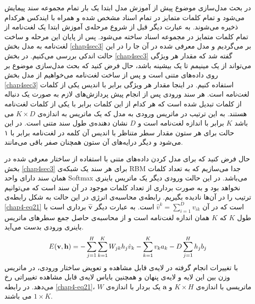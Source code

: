 در بحث مدل‌سازی موضوع پیش از آموزش مدل ابتدا یک بار تمام مجموعه سند پیمایش می‌‌شود و تمام کلمات متمایز در تمام اسناد مشخص شده و همراه با ایندکس هرکدام ذخیره می‌‌شوند. به عبارت دیگر قبل از شروع مرحله‌ی آموزش ابتدا یک لغت‌نامه از تمام کلمات متمایز در مجموعه اسناد ساخته می‌‌شود. پس از پایان این مرحله و ساخت لغت‌نامه به مدل بخش
\ref{chap4sec3}
بر می‌‌گردیم و مدل معرفی‌ شده در آن جا را در این حالت اندکی‌ بررسی‌ می‌‌کنیم. در بخش
\ref{chap4sec3}
گفته شد که مقدار هر ویژگی‌ می‌‌تواند از یک مینیمم تا یک بیشینه باشد، حال فرض کنید که بحث مدل‌سازی موضوع بر روی داده‌های متنی است و پس از ساخت لغت‌نامه می‌خواهیم از مدل بخش
\ref{chap4sec3}
استفاده کنیم. در اینجا مقدار هر ویژگی‌ برابر با اندیس یکی‌ از کلمات لغت‌نامه است. هر سند ورودی پس از انجام پیش پردازش‌های لازم به صورت یک دنباله از کلمات تبدیل شده است که هر کدام از این کلمات برابر با یکی‌ از کلمات لغت‌نامه هستند. به این ترتیب در ماتریس ورودی به مدل که یک ماتریس به انداز‌ه‌ی
$K \times D$
می‌ باشد
$K$
برابر با اندازه لغت‌نامه است و
$D$
نشان دهنده‌ی طول سند متنی است. در این حالت برای هر ستون مقدار سطر متناظر با اندیس آن کلمه در لغت‌نامه برابر با ۱ می‌‌شود و دیگر درایه‌های آن ستون همچنان صفر باقی‌ می‌‌مانند.

حال فرض کنید که برای مدل کردن داده‌های متنی با استفاده از ساختار معرفی‌ شده در بخش
\ref{chap4sec3}
برای هر سند یک شبکه‌ی
RBM
جدا می‌‌سازیم که به تعداد کلمات همان سند دارای واحد
Softmax
می‌باشد. در این حالت ورودی دیگر یک ماتریس باینری نخواهد بود و به صورت برداری از تعداد کلمات موجود در آن سند است که می‌‌توانیم ترتیب را در آن‌ها نادیده بگیریم. رابطه‌ی محاسبه‌ی انرژی در این حالت به شکل رابطه‌ی
\ref{chap4-eq21}
است که در آن
$\hat{v}^k = \sum_{i=1}^{D}v_{ik}$
است. به عبارت دیگر
$\hat{\textbf{v}}$
برداری است با طول
$K$
که 
$K$
همان اندازه لغت‌نامه است و از محاسبه‌ی حاصل جمع سطر‌های ماتریس باینری ورودی بدست می‌‌آید.
\begin{align}
	\centering
	\label{chap4-eq21}
	E(\textbf{v},\textbf{h})=-\sum_{j=1}^{H}\sum_{k=1}^{K}W_{jk}h_j\hat{v}_{k}-\sum_{k=1}^{K}v_{k}a_{k} - D\sum_{j=1}^{H}h_jb_j
\end{align}
با تغییرات انجام گرفته در لایه‌ی قابل مشاهده و تعویض ساختار ورودی، در ماتریس وزن بین این لایه و لایه‌ی پنهان و همچنین بایاس لایه‌ی قابل مشاهده تغییراتی‌ رخ می‌‌دهد. در رابطه
\ref{chap4-eq21}، $W$
ماتریسی با اندازه‌ی
$K \times H$
و
$\textbf{a}$
یک بردار با اندازه‌ی
$1 \times K$
می‌ باشند.

